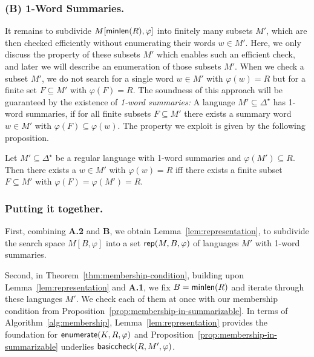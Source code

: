 \documentclass[envcountsame]{llncs}
\newcommand{\representation}{\ensuremath{{\sf rep}}\xspace}
\newcommand{\basiccheck}{\ensuremath{{\sf basiccheck}}\xspace}
\newcommand{\setenumeration}{\ensuremath{{\sf enumerate}}\xspace}
\newcommand{\minlength}{\ensuremath{{\sf minlen}}\xspace}
\begin{document}
\subsubsection{(B) 1-Word Summaries.}
\label{sec:1-word-summaries}
It remains to subdivide $M[\minlength(R), \varphi]$ into finitely many
subsets $M'$, which are then checked efficiently without enumerating
their words $w\in M'$.
Here, we only discuss the property of these subsets $M'$ which enables
such an efficient check, and later we will describe an enumeration of
those subsets $M'$.
When we check a subset $M'$, we do not search for a single word $w\in
M'$ with $\varphi(w)=R$ but for a finite set $F\subseteq M'$ with
$\varphi(F)=R$.
The soundness of this approach will be guaranteed by the existence of
\emph{1-word summaries:}
A language $M'\subseteq \Delta^\star$ has 1-word summaries, if for all
finite subsets $F\subseteq M'$ there exists a summary word $w\in M'$
with $\varphi(F)\subseteq\varphi(w)$.
The property we exploit is given by the following proposition.
\begin{proposition}
  \label{prop:membership-in-summarizable}
  Let $M'\subseteq \Delta^\star$ be a regular language with 1-word
  summaries and $\varphi(M')\subseteq R$.
Then there exists a $w\in M'$ with $\varphi(w)=R$ iff there exists a
  finite subset $F\subseteq M'$ with $\varphi(F)=\varphi(M')=R$.
\end{proposition}



\subsubsection{Putting it together.}
\label{sec:putting-it-together}
\begin{inparaenum}[]
\item First, combining \textbf{A.2} and \textbf{B}, we obtain
  Lemma~\ref{lem:representation}, to subdivide the search space $M[B,
  \varphi]$ into a set $\representation(M,B,\varphi)$ of languages $M'$ with
  1-word summaries.
\item Second, in Theorem~\ref{thm:membership-condition}, building upon
  Lemma~\ref{lem:representation} and \textbf{A.1}, we fix
  $B=\minlength(R)$ and iterate through these languages $M'$.
We check each of them at once with our membership condition from
  Proposition~\ref{prop:membership-in-summarizable}.
In terms of Algorithm~\ref{alg:membership},
  Lemma~\ref{lem:representation} provides the foundation for
  $\setenumeration(K,R,\varphi)$ and
  Proposition~\ref{prop:membership-in-summarizable} underlies
  $\basiccheck(R,M',\varphi)$.
\end{inparaenum}
\end{document}
